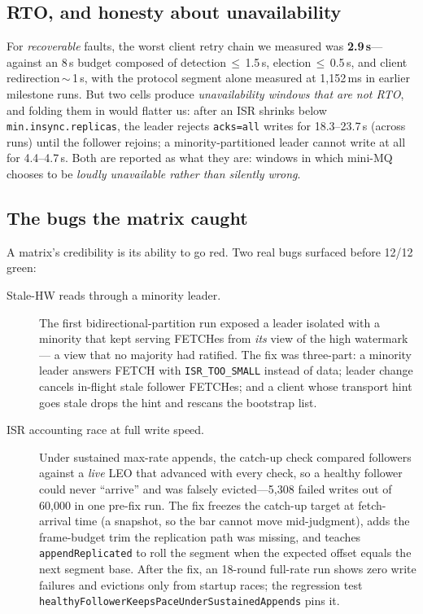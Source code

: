 \documentclass[letterpaper,twocolumn,10pt]{article}
\begin{document}
\subsection{RTO, and honesty about unavailability}
\label{sec:rto}
For \emph{recoverable} faults, the worst client retry chain we measured
was \textbf{2.9\,s}---against an 8\,s budget composed of
detection\,$\leq$\,1.5\,s, election\,$\leq$\,0.5\,s, and client
redirection\,$\sim$\,1\,s, with the protocol segment alone measured at
1{,}152\,ms in earlier milestone runs. But two cells produce
\emph{unavailability windows that are not RTO}, and folding them in
would flatter us: after an ISR shrinks below
\texttt{min.insync.replicas}, the leader rejects \texttt{acks=all}
writes for 18.3--23.7\,s (across runs) until the follower rejoins; a
minority-partitioned leader cannot write at all for 4.4--4.7\,s. Both
are reported as what they are: windows in which mini-MQ chooses to be
\emph{loudly unavailable rather than silently wrong}.

\subsection{The bugs the matrix caught}
\label{sec:chaos-bugs}
A matrix's credibility is its ability to go red. Two real bugs surfaced
before 12/12 green:

\begin{description}
\item[Stale-HW reads through a minority leader.] The first
  bidirectional-partition run exposed a leader isolated with a minority
  that kept serving FETCHes from \emph{its} view of the high watermark---
  a view that no majority had ratified. The fix was three-part: a
  minority leader answers FETCH with \texttt{ISR\_TOO\_SMALL} instead of
  data; leader change cancels in-flight stale follower FETCHes; and a
  client whose transport hint goes stale drops the hint and rescans the
  bootstrap list.
\item[ISR accounting race at full write speed.] Under sustained
  max-rate appends, the catch-up check compared followers against a
  \emph{live} LEO that advanced with every check, so a healthy follower
  could never ``arrive'' and was falsely evicted---5{,}308 failed writes
  out of 60{,}000 in one pre-fix run. The fix freezes the catch-up
  target at fetch-arrival time (a snapshot, so the bar cannot move
  mid-judgment), adds the frame-budget trim the replication path was
  missing, and teaches \texttt{appendReplicated} to roll the segment
  when the expected offset equals the next segment base. After the fix,
  an 18-round full-rate run shows zero write failures and evictions only
  from startup races; the regression test
  \texttt{healthyFollowerKeepsPaceUnderSustainedAppends} pins it.
\end{description}
\end{document}

